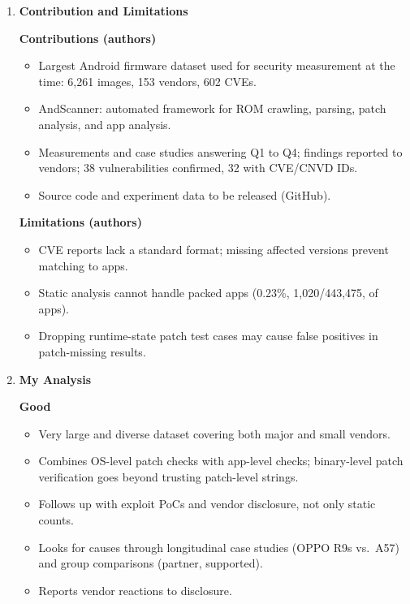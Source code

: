 \documentclass[11pt,a4paper]{article}
\newcommand{\entrypart}[1]{\textbf{\color{accent}#1}\par\vspace{2pt}}
\begin{document}
\begin{enumerate}
    \item \entrypart{Contribution and Limitations}

    \textbf{Contributions (authors)}
    \begin{itemize}[leftmargin=*,itemsep=1pt,topsep=2pt]
        \item Largest Android firmware dataset used for security measurement at the time: 6,261 images, 153 vendors, 602 CVEs.
        \item AndScanner: automated framework for ROM crawling, parsing, patch analysis, and app analysis.
        \item Measurements and case studies answering Q1 to Q4; findings reported to vendors; 38 vulnerabilities confirmed, 32 with CVE/CNVD IDs.
        \item Source code and experiment data to be released (GitHub).
    \end{itemize}

    \vspace{4pt}
    \textbf{Limitations (authors)}
    \begin{itemize}[leftmargin=*,itemsep=1pt,topsep=2pt]
        \item CVE reports lack a standard format; missing affected versions prevent matching to apps.
        \item Static analysis cannot handle packed apps (0.23\%, 1,020/443,475, of apps).
        \item Dropping runtime-state patch test cases may cause false positives in patch-missing results.
    \end{itemize}

    \item \entrypart{My Analysis}

    \textbf{Good}
    \begin{itemize}[leftmargin=*,itemsep=1pt,topsep=2pt]
        \item Very large and diverse dataset covering both major and small vendors.
        \item Combines OS-level patch checks with app-level checks; binary-level patch verification goes beyond trusting patch-level strings.
        \item Follows up with exploit PoCs and vendor disclosure, not only static counts.
        \item Looks for causes through longitudinal case studies (OPPO R9s vs.\ A57) and group comparisons (partner, supported).
        \item Reports vendor reactions to disclosure.
    \end{itemize}


\end{enumerate}
\end{document}
